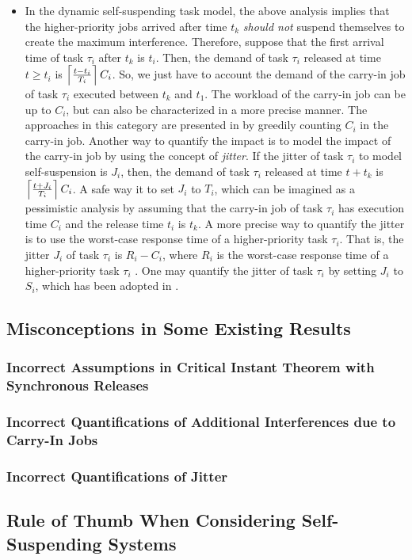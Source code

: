 \begin{itemize}
\begin{itemize}
\item In the dynamic self-suspending task model, the above analysis implies that the higher-priority jobs arrived after time $t_k$ \emph{should not} suspend themselves to create the maximum interference. Therefore, suppose that the first arrival time of task $\tau_i$ after $t_k$ is $t_i$. Then, the demand of task $\tau_i$ released at time $t \geq t_i$ is $\left\lceil{\frac{t-t_i}{T_i} }\right\rceil C_i$. So, we just have to account the demand of the carry-in job of task $\tau_i$ executed between $t_k$ and $t_1$. The workload of the carry-in job can be up to $C_i$, but can also be characterized in a more precise manner. The approaches in this category are presented in \cite{huangpass:dac2015,LiuChen:rtss2014} by greedily counting $C_i$ in the carry-in job. Another way to quantify the impact is to model the impact of the carry-in job by using the concept of \emph{jitter}. If the jitter of task $\tau_i$ to model self-suspension is $J_i$, then, the demand of task $\tau_i$ released at time $t+t_k$ is $\left\lceil{\frac{t+J_i}{T_i} }\right\rceil C_i$. A safe way it to set $J_i$ to $T_i$, which can be imagined as a pessimistic analysis by assuming that the carry-in job of task $\tau_i$ has execution time $C_i$ and the release time $t_i$ is $t_k$. A more precise way to quantify the jitter is to use the worst-case response time of a higher-priority task $\tau_i$. That is, the jitter $J_i$ of task $\tau_i$ is $R_i-C_i$, where $R_i$ is the worst-case response time of a higher-priority task $\tau_i$ \cite{huangpass:dac2015}. One may quantify the jitter of task $\tau_i$ by setting $J_i$ to $S_i$, which has been adopted in \cite{DBLP:conf/ecrts/AudsleyB04}.
\end{itemize}
\end{itemize}


\subsection{Misconceptions in Some Existing Results}
\subsubsection{Incorrect Assumptions in Critical Instant Theorem with Synchronous Releases}
\subsubsection{Incorrect Quantifications of Additional Interferences due to Carry-In Jobs}
\subsubsection{Incorrect Quantifications of Jitter}
\subsection{Rule of Thumb When Considering Self-Suspending Systems}
  
  
  
  
  
  
  
  
  
  
  
  
  
  
  